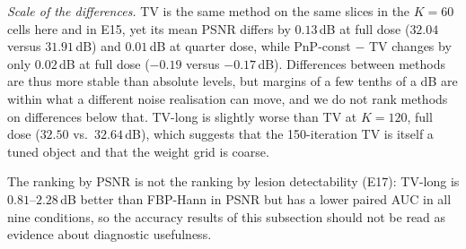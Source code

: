 \emph{Scale of the differences.} TV is the same method on the same slices in the $K=60$ cells here and in E15, yet its mean PSNR differs by $0.13$\,dB at full dose ($32.04$ versus $31.91$\,dB) and $0.01$\,dB at quarter dose, while PnP-const $-$ TV changes by only $0.02$\,dB at full dose ($-0.19$ versus $-0.17$\,dB). Differences between methods are thus more stable than absolute levels, but margins of a few tenths of a dB are within what a different noise
realisation can move, and we do not rank methods on differences below that.
TV-long is slightly worse than TV at $K=120$, full dose ($32.50$ vs.\ $32.64$\,dB), which suggests that the 150-iteration TV is itself a tuned object and that the weight grid is coarse.

The ranking by PSNR is not the ranking by lesion detectability (E17): TV-long is $0.81$--$2.28$\,dB better than FBP-Hann in PSNR but has a lower paired AUC in all nine conditions, so the accuracy results of this subsection should not be read as evidence about diagnostic usefulness.

